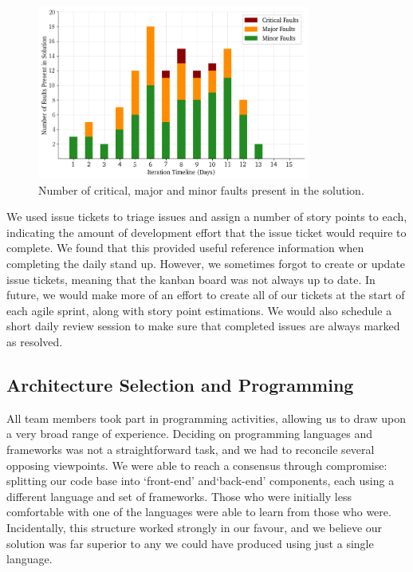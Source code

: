 \begin{figure}[h!]
	\centering
	\includegraphics[width=0.8\textwidth]{images/plot_faults}
	\caption{Number of critical, major and minor faults present in the solution.}
	\label{fig:plot_faults}
\end{figure}



We used issue tickets to triage issues and assign a number of story points to each, indicating the amount of development effort that the issue ticket would require to complete. We found that this provided useful reference information when completing the daily stand up. However, we sometimes forgot to create or update issue tickets, meaning that the kanban board was not always up to date. In future, we would make more of an effort to create all of our tickets at the start of each agile sprint, along with story point estimations. We would also schedule a short daily review session to make sure that completed issues are always marked as resolved.


\subsection{Architecture Selection and Programming}
All team members took part in programming activities, allowing us to draw upon a very broad range of experience. Deciding on programming languages and frameworks was not a straightforward task, and we had to reconcile several opposing viewpoints. We were able to reach a consensus through compromise: splitting our code base into `front-end’ and`back-end’ components, each using a different language and set of frameworks. Those who were initially less comfortable with one of the languages were able to learn from those who were. Incidentally, this structure worked strongly in our favour, and we believe our solution was far superior to any we could have produced using just a single language.

